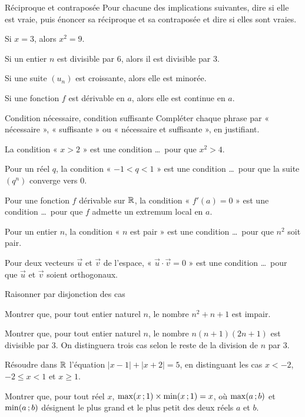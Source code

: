 \begin{exercice}[1]{Réciproque et contraposée}
Pour chacune des implications suivantes, dire si elle est vraie, puis énoncer sa réciproque et sa contraposée et dire si elles
sont vraies.
\begin{questions}
  \item Si $x=3$, alors $x^{2}=9$.
  \item Si un entier $n$ est divisible par $6$, alors il est divisible par $3$.
  \item Si une suite $(u_n)$ est croissante, alors elle est minorée.
  \item Si une fonction $f$ est dérivable en $a$, alors elle est continue en $a$.
\end{questions}
\end{exercice}


\begin{exercice}[2]{Condition nécessaire, condition suffisante}
Compléter chaque phrase par « nécessaire », « suffisante » ou « nécessaire et suffisante », en justifiant.
\begin{questions}
  \item La condition « $x>2$ » est une condition \dots\ pour que $x^{2}>4$.
  \item Pour un réel $q$, la condition « $-1<q<1$ » est une condition \dots\ pour que la suite $(q^{n})$ converge vers $0$.
  \item Pour une fonction $f$ dérivable sur $\mathbb{R}$, la condition « $f'(a)=0$ » est une condition \dots\ pour que $f$ admette un
    extremum local en $a$.
  \item Pour un entier $n$, la condition « $n$ est pair » est une condition \dots\ pour que $n^{2}$ soit pair.
  \item Pour deux vecteurs $\vec u$ et $\vec v$ de l'espace, « $\vec u\cdot\vec v=0$ » est une condition \dots\ pour que $\vec u$
    et $\vec v$ soient orthogonaux.
\end{questions}
\end{exercice}

\begin{exercice}[2]{Raisonner par disjonction des cas}
\begin{questions}
  \item Montrer que, pour tout entier naturel $n$, le nombre $n^{2}+n+1$ est impair.
  \item Montrer que, pour tout entier naturel $n$, le nombre $n(n+1)(2n+1)$ est divisible par $3$. On distinguera trois cas
    selon le reste de la division de $n$ par $3$.
  \item Résoudre dans $\mathbb{R}$ l'équation $|x-1|+|x+2|=5$, en distinguant les cas $x<-2$, $-2\leq x<1$ et $x\geq1$.
  \item Montrer que, pour tout réel $x$, $\max(x\,{;}\,1)\times\min(x\,{;}\,1)=x$, où $\max(a\,{;}\, b)$ et $\min(a\,{;}\, b)$ désignent le
    plus grand et le plus petit des deux réels $a$ et $b$.
\end{questions}
\end{exercice}

